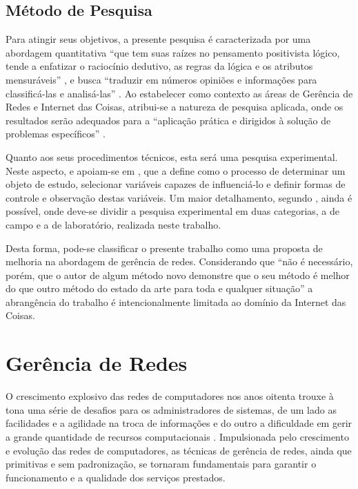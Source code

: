 \documentclass[twoside,english,brazilian]{UNISINOSmonografia}
\begin{document}
\section{Método de Pesquisa}

Para atingir seus objetivos, a presente pesquisa é caracterizada por uma 
abordagem quantitativa 
``que tem suas raízes no pensamento positivista lógico, tende a enfatizar o 
raciocínio dedutivo, as regras da lógica e os atributos mensuráveis''
\cite{Gerhardt2009},
e busca
``traduzir em números opiniões e informações para classificá-las e 
analisá-las''
\cite{MetodologiaUFSC2005}.
Ao estabelecer como contexto as áreas de Gerência de Redes e Internet das 
Coisas, atribui-se a natureza de pesquisa aplicada, onde os resultados serão 
adequados para a
``aplicação prática e dirigidos à solução de problemas específicos''
\cite{MetodologiaUFSC2005}.

Quanto aos seus procedimentos técnicos, esta será uma pesquisa experimental. 
Neste aspecto,  e  
apoiam-se em , que a define como o processo de determinar um 
objeto de estudo, selecionar variáveis capazes de influenciá-lo e definir 
formas de controle e observação destas variáveis.
Um maior detalhamento, segundo , ainda é possível, onde 
deve-se dividir a pesquisa experimental em duas categorias, a de campo e a de 
laboratório, realizada neste trabalho.

Desta forma, pode-se classificar o presente trabalho como uma proposta de 
melhoria na abordagem de gerência de redes. Considerando que ``não é 
necessário, porém, que o autor de algum método novo demonstre que o seu método 
é melhor do que outro método do estado da arte para toda e qualquer situação'' 
\cite{Wazlawick2008} a abrangência do trabalho é intencionalmente limitada ao 
domínio da Internet das Coisas. %



\chapter{Gerência de Redes}


O crescimento explosivo das redes de computadores nos anos oitenta trouxe à 
tona uma série de desafios para os administradores de sistemas, de um lado as 
facilidades e a agilidade na troca de informações e do outro a dificuldade em 
gerir a grande quantidade de recursos computacionais \cite{stallings1999snmp}.
Impulsionada pelo crescimento e evolução das redes de computadores, as 
técnicas de gerência de redes, ainda que primitivas e sem padronização, se 
tornaram fundamentais para garantir o 
funcionamento e a qualidade dos serviços prestados.  
\end{document}
